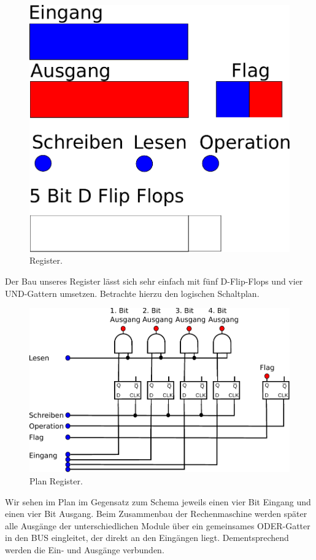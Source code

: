 \documentclass[11pt,a4paper,leqno]{report}
\numberwithin{equation}{chapter}
\begin{document}
\begin{figure}[H]
	\begin{center}
		\includegraphics[scale=0.3]{Bilder/register.pdf}
		\caption{Register.}
	\end{center}
\end{figure}
\noindent
Der Bau unseres Register l\"asst sich sehr einfach mit f\"unf D-Flip-Flops und vier UND-Gattern umsetzen. Betrachte hierzu den logischen Schaltplan.
\begin{figure}[H]
	\begin{center}
		\includegraphics[scale=0.7]{Bilder/reg.pdf}
		\caption{Plan Register.}
	\end{center}
\end{figure}
\noindent
Wir sehen im Plan im Gegensatz zum Schema jeweils einen vier Bit Eingang und einen vier Bit Ausgang. Beim Zusammenbau der Rechenmaschine werden sp\"ater alle Ausg\"ange der unterschiedlichen Module \"uber ein gemeinsames ODER-Gatter in den BUS eingleitet, der direkt an den Eing\"angen liegt. Dementsprechend werden die Ein- und Ausg\"ange verbunden.
\newpage
\end{document}
